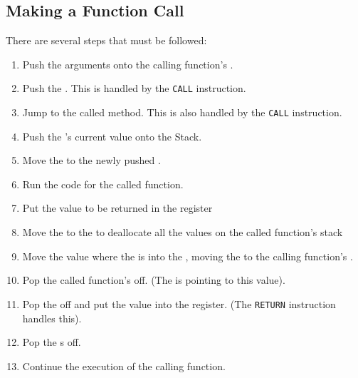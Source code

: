 \subsection{Making a Function Call}\label{subsec:Making_Function_Call}
There are several steps that must be followed:
\begin{enumerate}[noitemsep]
\item Push the arguments onto the calling function's .
\item Push the . This is handled by the \texttt{CALL} instruction.
\item Jump to the called method. This is also handled by the \texttt{CALL} instruction.
\item Push the 's current value onto the Stack.
\item Move the  to the newly pushed .
\item Run the code for the called function.
\item Put the value to be returned in the \raxRegister{} register
\item Move the  to the  to deallocate all the values on the called function's stack
\item Move the value where the  is into the , moving the  to the calling function's .
\item Pop the called function's  off. (The  is pointing to this value).
\item Pop the  off and put the value into the \ripRegister{} register. (The \texttt{RETURN} instruction handles this).
\item Pop the s off.
\item Continue the execution of the calling function.
\end{enumerate}

